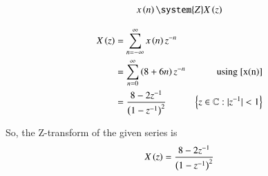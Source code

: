 \documentclass[journal,12pt,twocolumn]{IEEEtran}
\begin{document}
\begin{align}
     x \brak{n} \system{Z} X \brak{z} 
\end{align}

\begin{align}
     X \left(z\right) & = \sum_{n=-\infty}^{\infty} x \left(n\right)  z^{-n}\\
     & = \sum_{n=0}^{\infty} \left(8 + 6n\right) z^{-n} & \text{using } \eqref{x(n)}\\
     & = \frac{8-2z^{-1}}{\left(1-z^{-1}\right)^2} & \left\{z\in\mathbb{C} : |z^{-1}| < 1\right\}
\end{align}

So, the Z-transform of the given series is 
$$X\left(z\right) = \frac{8-2z^{-1}}{\left(1-z^{-1}\right)^2}$$


\end{document}
